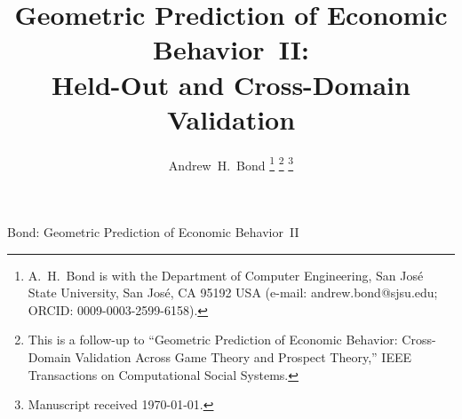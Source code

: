 \documentclass[journal]{IEEEtran}
\begin{document}
\title{Geometric Prediction of Economic Behavior~II:\\Held-Out and Cross-Domain Validation}

\author{Andrew~H.~Bond%
\thanks{A.~H.~Bond is with the Department of Computer Engineering, San Jos\'{e} State University, San Jos\'{e}, CA 95192 USA (e-mail: andrew.bond@sjsu.edu; ORCID: 0009-0003-2599-6158).}%
\thanks{This is a follow-up to ``Geometric Prediction of Economic Behavior: Cross-Domain Validation Across Game Theory and Prospect Theory,'' IEEE Transactions on Computational Social Systems.}%
\thanks{Manuscript received \today.}}

%
{Bond: Geometric Prediction of Economic Behavior~II}

\maketitle
\end{document}
